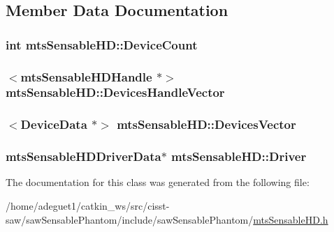 \subsection{Member Data Documentation}
\hypertarget{classmts_sensable_h_d_a75a41334d77a8db7e0913e9d5ca0483d}{
\subsubsection[{Device\-Count}]{\setlength{\rightskip}{0pt plus 5cm}int mts\-Sensable\-H\-D\-::\-Device\-Count}}\label{classmts_sensable_h_d_a75a41334d77a8db7e0913e9d5ca0483d}
\hypertarget{classmts_sensable_h_d_addc29ab0005b52b7c220957338fd13b0}{
\subsubsection[{Devices\-Handle\-Vector}]{$<$mts\-Sensable\-H\-D\-Handle $\ast$$>$ mts\-Sensable\-H\-D\-::\-Devices\-Handle\-Vector\hspace{0.3cm}{\ttfamily [protected]}}}\label{classmts_sensable_h_d_addc29ab0005b52b7c220957338fd13b0}
\hypertarget{classmts_sensable_h_d_a0c8ea80df145268d76c57d99ca5820e3}{
\subsubsection[{Devices\-Vector}]{$<${\bf Device\-Data} $\ast$$>$ mts\-Sensable\-H\-D\-::\-Devices\-Vector\hspace{0.3cm}{\ttfamily [protected]}}}\label{classmts_sensable_h_d_a0c8ea80df145268d76c57d99ca5820e3}
\hypertarget{classmts_sensable_h_d_abdb150f4135097e1530e967a8b4c9b8c}{
\subsubsection[{Driver}]{\setlength{\rightskip}{0pt plus 5cm}mts\-Sensable\-H\-D\-Driver\-Data$\ast$ mts\-Sensable\-H\-D\-::\-Driver\hspace{0.3cm}{\ttfamily [protected]}}}\label{classmts_sensable_h_d_abdb150f4135097e1530e967a8b4c9b8c}


The documentation for this class was generated from the following file\-:\begin{DoxyCompactItemize}
\item 
/home/adeguet1/catkin\-\_\-ws/src/cisst-\/saw/saw\-Sensable\-Phantom/include/saw\-Sensable\-Phantom/\hyperlink{mts_sensable_h_d_8h}{mts\-Sensable\-H\-D.\-h}\end{DoxyCompactItemize}
